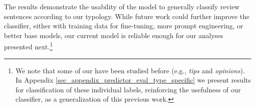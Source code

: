 The results demonstrate the usability of the model to generally classify review sentences according to our typology. While future work could further improve the classifier, either with training data for fine-tuning, more prompt engineering, or better base models, our current model is reliable enough for our analyses presented next.\footnote{We note that some of our \taxtypes{} have been studied before (e.g., \textit{tips} and \textit{opinions}). In Appendix \ref{sec_appendix_predictor_eval_type_specific} we present results for classification of these individual labels, reinforcing the usefulness of our classifier, as a generalization of this previous work.}


%

%





